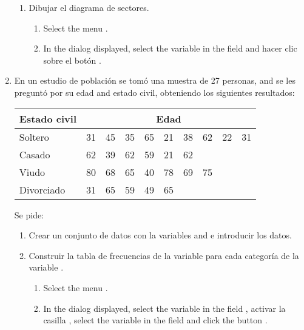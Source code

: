 \begin{enumerate}[leftmargin=*]
\begin{enumerate}
\item Dibujar el diagrama de sectores.
\begin{indication}
\begin{enumerate}
\item Select the menu .
\item In the dialog displayed, select the variable  in the field
 and hacer clic sobre el botón .
\end{enumerate}
\end{indication}
\end{enumerate}

\item  En un estudio de población se tomó una muestra de 27 personas, and se les preguntó por su edad and estado civil,
obteniendo los siguientes resultados:
\begin{center}
\begin{tabular}{|l|rrrrrrrrr|}
\hline
Estado civil & \multicolumn{9}{c|}{Edad}\\
\hline
Soltero    & 31 & 45 & 35 & 65 & 21 & 38 & 62 & 22 & 31 \\
Casado     & 62 & 39 & 62 & 59 & 21 & 62 &    &    &    \\
Viudo      & 80 & 68 & 65 & 40 & 78 & 69 & 75 &    &    \\
Divorciado & 31 & 65 & 59 & 49 & 65 &    &    &    &    \\
\hline
\end{tabular}
\end{center}

Se pide:
\begin{enumerate}
\item Crear un conjunto de datos con la variables  and  e introducir los datos.
\item Construir la tabla de frecuencias de la variable  para cada categoría de la
variable .
\begin{indication}
\begin{enumerate}
\item Select the menu .
\item In the dialog displayed, select the variable  in the field , activar la casilla , select the variable  in the field
 and click the button .
\end{enumerate}
\end{indication}


\end{enumerate}
\end{enumerate}
